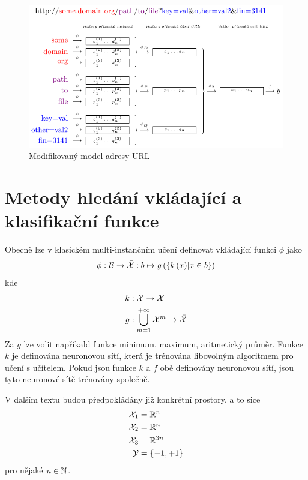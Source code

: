 \begin{figure}[h]
	\centering
	\includegraphics{images/model_modified_MIL/model_modified_MIL.pdf}
	\caption{Modifikovaný model adresy URL}\label{url_model_modified_MIL}
\end{figure}

\section{Metody hledání vkládající a klasifikační funkce}
Obecně lze v klasickém multi-instančním učení definovat vkládající funkci \( \phi \) jako
\begin{equation}\label{netpooling}
	\phi : \mathcal B \to \bar{\mathcal X} : b \mapsto g \left( \left\{ k \left( x \right) \middle| x \in b \right\} \right)
\end{equation}
kde 
\begin{align*}
	k &: \mathcal X \to \mathcal X \\
	g &: \bigcup_{m = 1}^{+ \infty} \mathcal X^m \to \bar{\mathcal X}
\end{align*}
Za \( g \) lze volit napříkald funkce minimum, maximum, aritmetický průměr. Funkce \( k \) je definována neuronovou sítí, která je trénována libovolným algoritmem pro učení s učítelem. Pokud jsou funkce \( k \) a \( f \) obě definovány neuronovou sítí, jsou tyto neuronové sítě trénovány společně.

V dalším textu budou předpokládány již konkrétní prostory, a to sice
\begin{align*}
	\mathcal X_1 &= \mathbb R^n \\
	\mathcal X_2 &= \mathbb R^n \\
	\mathcal X_3 &= \mathbb R^{3n} \\
	\mathcal Y &= \left\{ -1, +1 \right\}
\end{align*}
pro nějaké \( n \in \mathbb N \).

